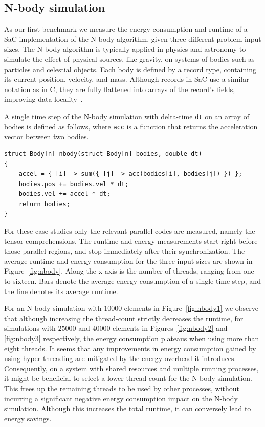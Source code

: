 \subsection{N-body simulation}
As our first benchmark we measure the energy consumption and runtime of a SaC implementation of
the N-body algorithm, given three different problem input sizes. The N-body algorithm is typically
applied in physics and astronomy to simulate the effect of physical sources, like gravity, on
systems of bodies such as particles and celestial objects. Each body is defined by a record type,
containing its current position, velocity, and mass. Although records in SaC use a similar
notation as in C, they are fully flattened into arrays of the record's fields, improving data
locality~\cite{sac-records}.

A single time step of the N-body simulation with delta-time \verb|dt| on an array of bodies is
defined as follows, where \verb|acc| is a function that returns the acceleration vector between two
bodies.
\begin{verbatim}
struct Body[n] nbody(struct Body[n] bodies, double dt)
{
    accel = { [i] -> sum({ [j] -> acc(bodies[i], bodies[j]) }) };
    bodies.pos += bodies.vel * dt;
    bodies.vel += accel * dt;
    return bodies;
}
\end{verbatim}

For these case studies only the relevant parallel codes are measured, namely the tensor
comprehensions. The runtime and energy measurements start right before those parallel regions, and
stop immediately after their synchronization. The average runtime and energy consumption for the
three input sizes are shown in Figure~\ref{fig:nbody}. Along the x-axis is the number of threads,
ranging from one to sixteen. Bars denote the average energy consumption of a single time step, and
the line denotes its average runtime.

For an N-body simulation with $10000$ elements in Figure~\ref{fig:nbody1} we observe that although
increasing the thread-count strictly decreases the runtime, for simulations with $25000$ and $40000$
elements in Figures~\ref{fig:nbody2} and \ref{fig:nbody3} respectively, the energy consumption
plateaus when using more than eight threads. It seems that any improvements in energy consumption
gained by using hyper-threading are mitigated by the energy overhead it introduces. Consequently, on
a system with shared resources and multiple running processes, it might be beneficial to select a
lower thread-count for the N-body simulation. This frees up the remaining threads to be used by
other processes, without incurring a significant negative energy consumption impact on the N-body
simulation. Although this increases the total runtime, it can conversely lead to energy savings.

